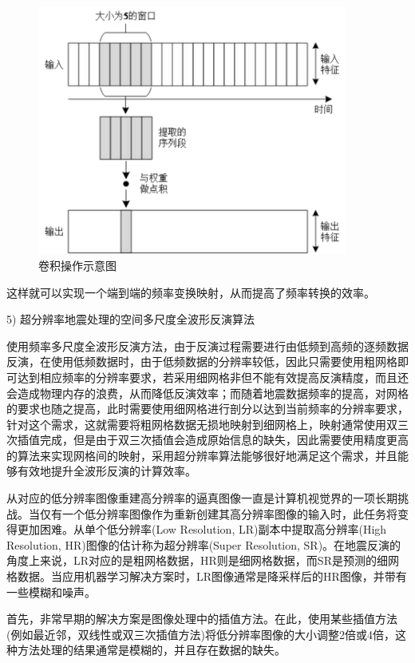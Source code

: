 \documentclass[11pt]{article}
\begin{document}
\begin{figure}[htbp]
\centering
\includegraphics[width=4in]{./FigureFolder/Predict/Conv.pdf}
\caption{卷积操作示意图}
\label{Fig_Conv}
\end{figure}
\par
这样就可以实现一个端到端的频率变换映射，从而提高了频率转换的效率。
\par
5) 超分辨率地震处理的空间多尺度全波形反演算法
\par
使用频率多尺度全波形反演方法，由于反演过程需要进行由低频到高频的逐频数据反演，在使用低频数据时，由于低频数据的分辨率较低，因此只需要使用粗网格即可达到相应频率的分辨率要求，若采用细网格非但不能有效提高反演精度，而且还会造成物理内存的浪费，从而降低反演效率；而随着地震数据频率的提高，对网格的要求也随之提高，此时需要使用细网格进行剖分以达到当前频率的分辨率要求，针对这个需求，这就需要将粗网格数据无损地映射到细网格上，映射通常使用双三次插值完成，但是由于双三次插值会造成原始信息的缺失，因此需要使用精度更高的算法来实现网格间的映射，采用超分辨率算法能够很好地满足这个需求，并且能够有效地提升全波形反演的计算效率。
\par
从对应的低分辨率图像重建高分辨率的逼真图像一直是计算机视觉界的一项长期挑战。当仅有一个低分辨率图像作为重新创建其高分辨率图像的输入时，此任务将变得更加困难。从单个低分辨率(Low Resolution, LR)副本中提取高分辨率(High Resolution, HR)图像的估计称为超分辨率(Super Resolution, SR)。在地震反演的角度上来说，LR对应的是粗网格数据，HR则是细网格数据，而SR是预测的细网格数据。当应用机器学习解决方案时，LR图像通常是降采样后的HR图像，并带有一些模糊和噪声。
\par
首先，非常早期的解决方案是图像处理中的插值方法。在此，使用某些插值方法(例如最近邻，双线性或双三次插值方法)将低分辨率图像的大小调整2倍或4倍，这种方法处理的结果通常是模糊的，并且存在数据的缺失。
\par
\end{document}
